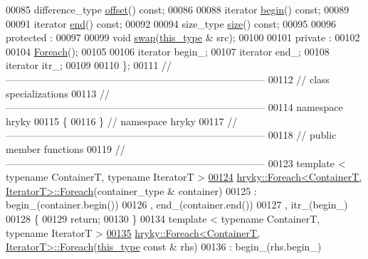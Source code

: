 \begin{DoxyCode}
00085     difference\_type \hyperlink{classhryky_1_1_foreach_aab1aceaecb09f71b9ba33ca9ceb49fb1}{offset}() \textcolor{keyword}{const};
00086 
00088     iterator \hyperlink{classhryky_1_1_foreach_af92e7d3b0f4b07a22856f64ade36f456}{begin}() \textcolor{keyword}{const};
00089 
00091     iterator \hyperlink{classhryky_1_1_foreach_abc6a85f2269646d8f110df39aff5555e}{end}() \textcolor{keyword}{const};
00092 
00094     size\_type \hyperlink{classhryky_1_1_foreach_a4f53055669dda7a72378659f24e21418}{size}() \textcolor{keyword}{const};
00095 
00096 \textcolor{keyword}{protected} :
00097 
00099     \textcolor{keywordtype}{void} \hyperlink{classhryky_1_1_foreach_a3c8dd1fa22806ebb2966caeed1280960}{swap}(\hyperlink{classhryky_1_1_foreach}{this_type} & src);
00100 
00101 \textcolor{keyword}{private} :
00102 
00104     \hyperlink{classhryky_1_1_foreach}{Foreach}();
00105 
00106     iterator begin\_;
00107     iterator end\_;
00108     iterator itr\_;
00109 
00110 \};
00111 \textcolor{comment}{//
      ------------------------------------------------------------------------------}
00112 \textcolor{comment}{// class specializations}
00113 \textcolor{comment}{//
      ------------------------------------------------------------------------------}
00114 \textcolor{keyword}{namespace }hryky
00115 \{
00116 \} \textcolor{comment}{// namespace hryky}
00117 \textcolor{comment}{//
      ------------------------------------------------------------------------------}
00118 \textcolor{comment}{// public member functions}
00119 \textcolor{comment}{//
      ------------------------------------------------------------------------------}
00123 \textcolor{comment}{}\textcolor{keyword}{template} < \textcolor{keyword}{typename} ContainerT, \textcolor{keyword}{typename} IteratorT >
\hypertarget{foreach_8h_source_l00124}{}\hyperlink{classhryky_1_1_foreach_af47d8a0d8fc0256928e8fdf293bc1b9a}{00124} \hyperlink{classhryky_1_1_foreach}{hryky::Foreach<ContainerT, IteratorT>::Foreach}(container\_type & container)
00125     : begin\_(container.begin())
00126       , end\_(container.end())
00127       , itr\_(begin\_)
00128 \{
00129     \textcolor{keywordflow}{return};
00130 \}
00134 \textcolor{keyword}{template} < \textcolor{keyword}{typename} ContainerT, \textcolor{keyword}{typename} IteratorT >
\hypertarget{foreach_8h_source_l00135}{}\hyperlink{classhryky_1_1_foreach_a7d4e81ae23eccd7c85a2730cdd74fe3e}{00135} \hyperlink{classhryky_1_1_foreach}{hryky::Foreach<ContainerT, IteratorT>::Foreach}(\hyperlink{classhryky_1_1_foreach}{this_type} \textcolor{keyword}{const} & rhs)
00136     : begin\_(rhs.begin\_)

\end{DoxyCode}
